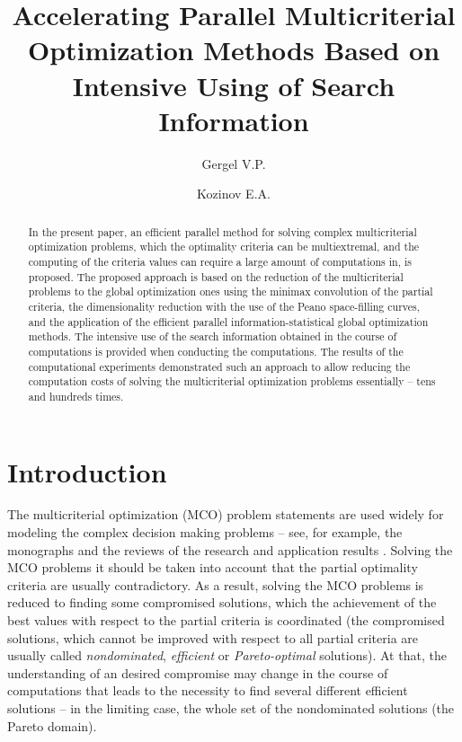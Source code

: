 \documentclass[procedia]{easychair}
\title{Accelerating Parallel Multicriterial Optimization Methods 
Based on Intensive Using of Search Information}
\author{
    Gergel V.P.
\and
    Kozinov E.A.
}
\institute{
  Lobachevsky State University of Nizhni Novgorod\\ 
	Nizhni Novgorod, Russia \\
  \email{gergel@unn.ru, evgeny.kozinov@itmm.unn.ru} 
 }
\begin{document}
\maketitle


\begin{abstract}
  In the present paper, an efficient parallel method for solving complex multicriterial optimization problems, which the optimality criteria can be multiextremal, and the computing of the criteria values can require a large amount of computations in, is proposed. The proposed approach is based on the reduction of the multicriterial problems to the global optimization ones using the minimax convolution of the partial criteria, the dimensionality reduction with the use of the Peano space-filling curves, and the application of the efficient parallel information-statistical global optimization methods. The intensive use of the search information obtained in the course of computations is provided when conducting the computations. The results of the computational experiments demonstrated such an approach to allow reducing the computation costs of solving the multicriterial optimization problems essentially -- tens and hundreds times.
\end{abstract}


%
%

\section{Introduction}
\label{sect:1}

The multicriterial optimization (MCO) problem statements are used widely for modeling the complex decision making problems -- see, for example, the monographs \cite{c5,c7,c26,c27} and the reviews of the research and application results \cite{c8,c10,c20,c25}. 
Solving the MCO problems it should be taken into account that the partial optimality criteria are usually contradictory. As a result, solving the MCO problems is reduced to finding some compromised solutions, which the achievement of the best values with respect to the partial criteria is coordinated (the compromised solutions, which cannot be improved with respect to all partial criteria are usually called {\it nondominated}, {\it efficient} or {\it Pareto-optimal} solutions). At that, the understanding of an desired compromise may change in the course of computations that leads to the necessity to find several different efficient solutions -- in the limiting case, the whole set of the nondominated solutions (the Pareto domain).\par
\end{document}
